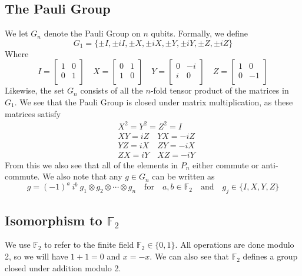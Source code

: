 \message{ !name(report_1.tex)}\documentclass[11pt]{article}
\theoremstyle{definition}
\theoremstyle{plain}
\begin{document}
\subsection{The Pauli Group}
We let $G_n$ denote the Pauli Group on $n$ qubits. Formally, we define \begin{equation}
  G_1 = \{ \pm I, \pm i I, \pm X, \pm iX, \pm Y, \pm i Y, \pm Z, \pm i Z \}
\end{equation}
Where 
\begin{equation}
I = 
\begin{bmatrix}
  1 & 0 \\
  0 & 1 \\ 
\end{bmatrix} \quad 
X = 
\begin{bmatrix}
  0 & 1 \\
  1 & 0 \\ 
\end{bmatrix} \quad 
Y =   
\begin{bmatrix}
  0 & -i \\
  i & 0 \\ 
\end{bmatrix} \quad 
Z =  
\begin{bmatrix}
  1 & 0 \\
  0 & -1 \\ 
\end{bmatrix}
\end{equation}
Likewise, the set $G_n$ consists of all the $n$-fold tensor product of the matrices in $G_1$. We see that the Pauli Group is closed under matrix multiplication, as these matrices satisfy 
\begin{align}
  & X^2 = Y^2 = Z^2 = I \label{pauli_1}\\
  & XY = iZ \quad YX = -iZ \\
  & YZ = iX \quad ZY = -iX \\
  & ZX = iY \quad XZ = -iY \label{pauli_3}
\end{align}
From this we also see that all of the elements in $P_n$ either commute or anti-commute. We also note that any $g \in G_n$ can be written as
\begin{equation}\label{pauli_2}
  g = {(-1)}^a \ i^b \ g_1 \otimes g_2 \otimes \cdots \otimes
  g_n \quad \text{for} \quad a, b \in \mathbb{F}_2 \quad \text{and} \quad
  g_j \in \{ I, X, Y, Z \} 
\end{equation}

\subsection{Isomorphism to $\mathbb{F}_2$}
We use $\mathbb{F}_2$ to refer to the finite field $\mathbb{F}_2 \in \{0, 1\}$. All operations are done modulo 2, so we will have $1 + 1 = 0$ and $x = -x$. We can also see that $\mathbb{F}_2$ defines a group closed under addition modulo 2.
\end{document}
